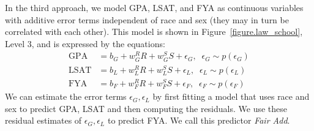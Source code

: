 In the third approach, we model GPA, LSAT, and FYA as continuous variables with additive error terms independent of race and sex (they may in turn be correlated with each other). This model is shown in Figure~\ref{figure.law_school}, Level 3, and is expressed by the equations:
\begin{align}
\mbox{GPA} &= b_{G} + w_{G}^R R + w_{G}^S S + \epsilon_G, \;\; \epsilon_G \sim p(\epsilon_G) \nonumber \\
\mbox{LSAT} &= b_{L} + w_{L}^R R + w_{L}^S S + \epsilon_L, \;\; \epsilon_L \sim p(\epsilon_L) \nonumber \\
\mbox{FYA} &= b_{F} + w_{F}^R R + w_{F}^S S + \epsilon_F, \;\; \epsilon_F \sim p(\epsilon_F) \nonumber
\end{align}
We can estimate the error terms $\epsilon_G,\epsilon_L$ by first fitting a model that uses race and sex to predict GPA, LSAT and then computing the residuals. We use these residual estimates of $\epsilon_G,\epsilon_L$ to predict FYA. We call this predictor \emph{Fair Add}.






